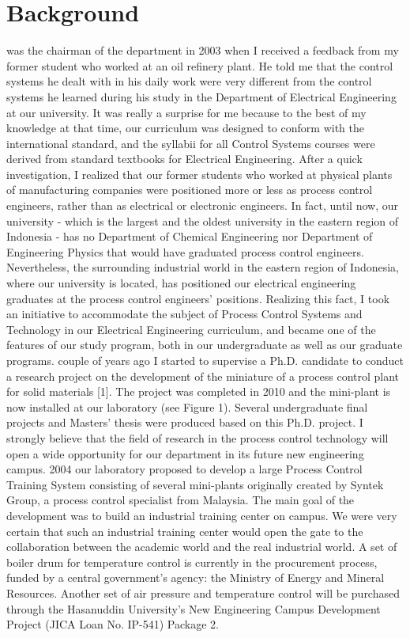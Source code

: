 \documentclass[journal]{IEEEtran}
\begin{document}
\section{Background}
 was the chairman of the department in 2003 when I received a feedback from my former student who worked at an oil refinery plant. He told me that the control systems he dealt with in his daily work were very different from the control systems he learned during his study in the Department of Electrical Engineering at our university. It was really a surprise for me because to the best of my knowledge at that time, our curriculum was designed to conform with the international standard, and the syllabii for all Control Systems courses were derived from standard textbooks for Electrical Engineering. After  a quick  investigation, I realized that our former students who worked at physical plants of manufacturing companies were positioned more or less as process control engineers, rather than as electrical or electronic engineers. In fact, until now, our university - which is the largest and the oldest university in the eastern region of Indonesia - has no Department of Chemical Engineering nor Department of Engineering Physics that would have graduated process control engineers. Nevertheless, the surrounding industrial world in the eastern region of Indonesia, where our university is located, has positioned our electrical engineering graduates at the process control engineers' positions. Realizing this fact, I took an initiative to accommodate the subject of Process Control Systems and Technology in our Electrical Engineering curriculum, and became one of the features of our study program, both in our undergraduate as well as our graduate programs.
 couple of years ago I started to supervise a Ph.D. candidate to conduct a research project on the development of the miniature of a process control plant for solid materials [1]. The project was completed in 2010 and the mini-plant is now installed at our laboratory (see Figure 1). Several undergraduate final projects and Masters' thesis were produced based on this Ph.D. project. I strongly believe that the field of research in the process control technology will open a wide opportunity for our department in its future new engineering campus. 
 2004 our laboratory proposed to develop a large Process Control Training System consisting of several mini-plants originally created by Syntek Group, a process control specialist from Malaysia. The main goal of the development was to build an industrial training center on campus. We were very certain that such an industrial training center would open the gate to the collaboration between the academic world and the real industrial world. A set of boiler drum for temperature control is currently in the procurement process, funded by a central government's agency: the  Ministry of Energy and Mineral Resources. Another set of air pressure and temperature control will be purchased through the Hasanuddin University's New Engineering Campus Development Project (JICA Loan No. IP-541) Package 2.
\end{document}
